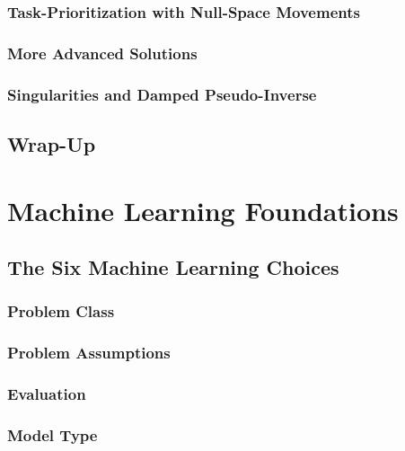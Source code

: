 		\subsection{Task-Prioritization with Null-Space Movements} %

		\subsection{More Advanced Solutions} %

		\subsection{Singularities and Damped Pseudo-Inverse} %

	\section{Wrap-Up} %

\chapter{Machine Learning Foundations} %

	\section{The Six Machine Learning Choices} %

		\subsection{Problem Class} %

		\subsection{Problem Assumptions} %

		\subsection{Evaluation} %

		\subsection{Model Type} %

